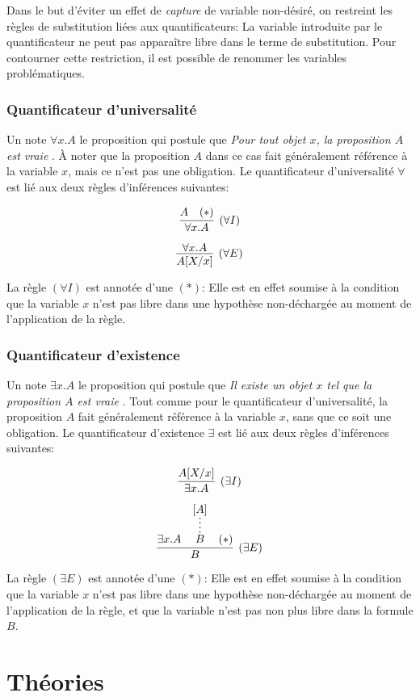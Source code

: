 Dans le but d'éviter un effet de \textit{capture} de variable non-désiré, on restreint les règles de substitution liées aux quantificateurs:
La variable introduite par le quantificateur ne peut pas apparaître libre dans le terme de substitution.
Pour contourner cette restriction, il est possible de renommer les variables problématiques.

\subsubsection{Quantificateur d'universalité}

Un note $\forall x. A$ le proposition qui postule que \og \textit{Pour tout objet $x$, la proposition $A$ est vraie} \fg{}.
À noter que la proposition $A$ dans ce cas fait généralement référence à la variable $x$, mais ce n'est pas une obligation.
Le quantificateur d'universalité $\forall$ est lié aux deux règles d'inférences suivantes:

\[
\infer[({\forall}I)]{\forall x. A}{A & (*)}
\]

\[
\infer[({\forall}E)]{A[X / x]}{\forall x. A}
\]

La règle $({\forall}I)$ est annotée d'une $(*)$: Elle est en effet soumise à la condition que la variable $x$ n'est pas libre dans une hypothèse non-déchargée au moment de l'application de la règle.

\subsubsection{Quantificateur d'existence}

Un note $\exists x. A$ le proposition qui postule que \og \textit{Il existe un objet $x$ tel que la proposition $A$ est vraie} \fg{}.
Tout comme pour le quantificateur d'universalité, la proposition $A$ fait généralement référence à la variable $x$, sans que ce soit une obligation.
Le quantificateur d'existence $\exists$ est lié aux deux règles d'inférences suivantes:

\[
\infer[({\exists}I)]{\exists x. A}{A[X / x]}
\]

\[
\infer[({\exists}E)]{B}{\exists x. A & \infer*{B}{[A]} & (*)}
\]

La règle $({\exists}E)$ est annotée d'une $(*)$: Elle est en effet soumise à la condition que la variable $x$ n'est pas libre dans une hypothèse non-déchargée au moment de l'application de la règle, et que la variable n'est pas non plus libre dans la formule $B$.

\section{Théories}

